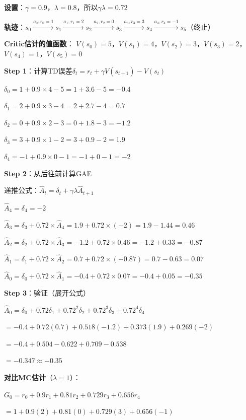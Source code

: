 \documentclass[11pt,a4paper]{article}
\theoremstyle{definition}
\begin{document}
\begin{calculation}
\textbf{设置}：$\gamma = 0.9$，$\lambda = 0.8$，所以$\gamma\lambda = 0.72$

\textbf{轨迹}：$s_0 \xrightarrow{a_0, r_0=1} s_1 \xrightarrow{a_1, r_1=2} s_2 \xrightarrow{a_2, r_2=0} s_3 \xrightarrow{a_3, r_3=3} s_4 \xrightarrow{a_4, r_4=-1} s_5$（终止）

\textbf{Critic估计的值函数}：
$V(s_0) = 5$，$V(s_1) = 4$，$V(s_2) = 3$，$V(s_3) = 2$，$V(s_4) = 1$，$V(s_5) = 0$

\textbf{Step 1}：计算TD误差$\delta_t = r_t + \gamma V(s_{t+1}) - V(s_t)$

$\delta_0 = 1 + 0.9 \times 4 - 5 = 1 + 3.6 - 5 = -0.4$

$\delta_1 = 2 + 0.9 \times 3 - 4 = 2 + 2.7 - 4 = 0.7$

$\delta_2 = 0 + 0.9 \times 2 - 3 = 0 + 1.8 - 3 = -1.2$

$\delta_3 = 3 + 0.9 \times 1 - 2 = 3 + 0.9 - 2 = 1.9$

$\delta_4 = -1 + 0.9 \times 0 - 1 = -1 + 0 - 1 = -2$

\textbf{Step 2}：从后往前计算GAE

递推公式：$\hat{A}_t = \delta_t + \gamma\lambda \hat{A}_{t+1}$

$\hat{A}_4 = \delta_4 = -2$

$\hat{A}_3 = \delta_3 + 0.72 \times \hat{A}_4 = 1.9 + 0.72 \times (-2) = 1.9 - 1.44 = 0.46$

$\hat{A}_2 = \delta_2 + 0.72 \times \hat{A}_3 = -1.2 + 0.72 \times 0.46 = -1.2 + 0.33 = -0.87$

$\hat{A}_1 = \delta_1 + 0.72 \times \hat{A}_2 = 0.7 + 0.72 \times (-0.87) = 0.7 - 0.63 = 0.07$

$\hat{A}_0 = \delta_0 + 0.72 \times \hat{A}_1 = -0.4 + 0.72 \times 0.07 = -0.4 + 0.05 = -0.35$

\textbf{Step 3}：验证（展开公式）

$\hat{A}_0 = \delta_0 + 0.72\delta_1 + 0.72^2\delta_2 + 0.72^3\delta_3 + 0.72^4\delta_4$

$= -0.4 + 0.72(0.7) + 0.518(-1.2) + 0.373(1.9) + 0.269(-2)$

$= -0.4 + 0.504 - 0.622 + 0.709 - 0.538$

$= -0.347 \approx -0.35$ \checkmark

\textbf{对比MC估计}（$\lambda = 1$）：

$G_0 = r_0 + 0.9r_1 + 0.81r_2 + 0.729r_3 + 0.656r_4$

$= 1 + 0.9(2) + 0.81(0) + 0.729(3) + 0.656(-1)$


\end{calculation}
\end{document}
